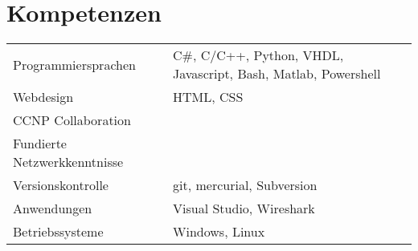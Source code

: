 \section*{Kompetenzen}
\begin{tabularx}{\textwidth}{l|l}
Programmiersprachen & C\#, C/C++, Python, VHDL, Javascript, Bash, Matlab, Powershell \\
Webdesign & HTML, CSS \\
CCNP Collaboration \\
Fundierte Netzwerkkenntnisse \\
Versionskontrolle & git, mercurial, Subversion \\
Anwendungen & Visual Studio, Wireshark \\
Betriebssysteme & Windows, Linux
\end{tabularx}

